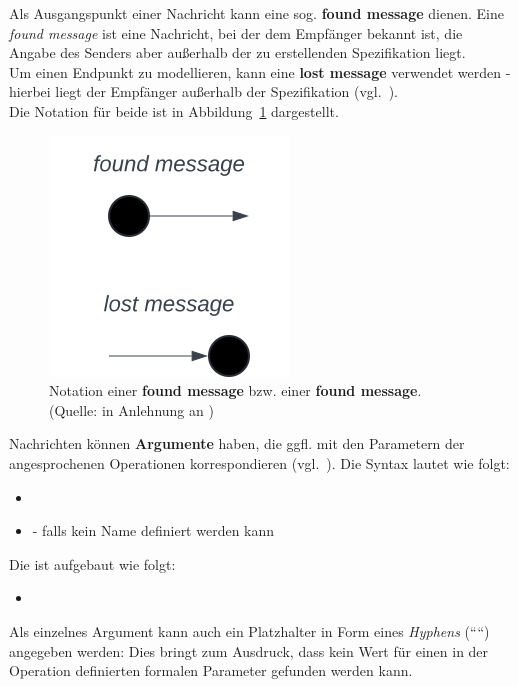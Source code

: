 \noindent
Als Ausgangspunkt einer Nachricht kann eine sog. \textbf{found message} dienen. Eine \textit{found message} ist eine Nachricht, bei der dem Empfänger bekannt ist, die Angabe des Senders aber außerhalb der zu erstellenden Spezifikation liegt.\\
Um einen Endpunkt zu modellieren, kann eine \textbf{lost message} verwendet werden - hierbei liegt der Empfänger außerhalb der Spezifikation  (vgl.~\cite[598]{OMG17}).\\
Die Notation für beide ist in Abbildung~\ref{fig:lost-found-message} dargestellt.

\begin{figure}
    \centering
    \includegraphics[scale=0.5]{part three/Sequenzdiagramme/img/lost-found-message}
    \caption{Notation einer \textbf{found message} bzw. einer \textbf{found message}. (Quelle: in Anlehnung an \cite[596]{OMG17})}
    \label{fig:lost-found-message}
\end{figure}

\noindent
Nachrichten können \textbf{Argumente} haben, die ggfl. mit den Parametern der angesprochenen Operationen korrespondieren (vgl.~\cite[32]{Buh09}).
Die Syntax lautet wie folgt:

\begin{itemize}
    \item {}
    \item \code{*} - falls kein Name definiert werden kann
\end{itemize}

\noindent
Die  ist aufgebaut wie folgt:

\begin{itemize}
    \item {}
\end{itemize}

\noindent
Als einzelnes Argument kann auch ein Platzhalter in Form eines \textit{Hyphens} (``\code{-}``) angegeben werden: Dies bringt zum Ausdruck, dass kein Wert für einen in der Operation definierten formalen Parameter gefunden werden kann.\\


